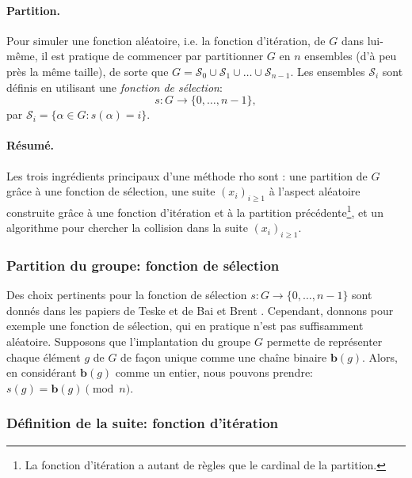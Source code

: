 \documentclass[a4paper, titlepage, 11pt]{article}
\theoremstyle{definition}
\theoremstyle{remark}
\def\mbf #1{\mathbf{#1}}
\begin{document}
\paragraph{Partition.} Pour simuler une fonction aléatoire, i.e. la fonction d'itération, de $G$ dans lui-même, il est pratique de commencer par partitionner $G$ en $n$ ensembles (d’à peu près la même taille), de sorte que $G = \mathcal{S}_0 \cup  \mathcal{S}_1 \cup \dots \cup \mathcal{S}_{n-1}$. Les ensembles $\mathcal{S}_i$ sont définis en utilisant une \textit{fonction de sélection}: $$s : G \rightarrow \{0, \dots, n-1 \},$$ par $\mathcal{S}_i = \{\alpha \in G : s(\alpha) = i\}$.

\paragraph{Résumé.} Les trois ingrédients principaux d'une méthode rho sont : une partition de $G$ grâce à une fonction de sélection, une suite ${(x_i)}_{i\geqslant 1}$ à l'aspect aléatoire construite grâce à une fonction d'itération et à la partition précédente\footnote{La fonction d'itération a autant de règles que le cardinal de la partition.}, et un algorithme pour chercher la collision dans la suite ${(x_i)}_{i\geqslant 1}$.

\subsubsection{Partition du groupe: fonction de sélection}

Des choix pertinents pour la fonction de sélection $s : G \rightarrow \{0, \dots, n-1 \}$ sont donnés dans les papiers de Teske \cite{teske2001} et de Bai et Brent \cite{bai2008}. Cependant, donnons pour exemple une fonction de sélection, qui en pratique n'est pas \og{}suffisamment aléatoire\fg{}. Supposons que l'implantation du groupe $G$ permette de représenter chaque élément $g$ de $G$ de façon unique comme une chaîne binaire $\mbf b(g)$. Alors, en considérant $\mbf b(g)$ comme un entier, nous pouvons prendre: $s(g) = \mbf b(g) \pmod{n}$.

\subsubsection{Définition de la suite: fonction d'itération}
\end{document}
